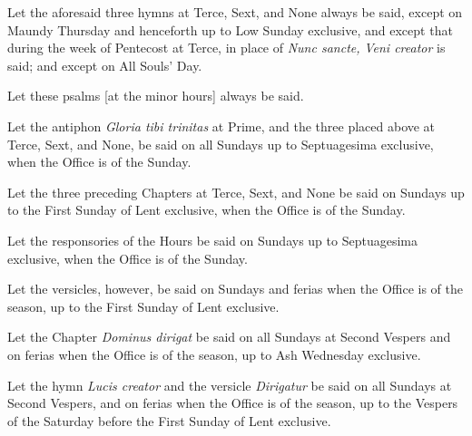 \documentclass[openany]{book}
\renewcommand{\\}{\par\hspace*{.25em}} %
\renewcommand{\newline}{\par}
\begin{document}
\newline Let the aforesaid three hymns at Terce, Sext, and None always be said, except on Maundy Thursday and henceforth up to Low Sunday exclusive, and except that during the week of Pentecost at Terce, in place of \emph{Nunc sancte,} \emph{Veni creator} is said; and except on All Souls' Day.
\newline Let these psalms [at the minor hours] always be said.
\newline Let the antiphon \emph{Gloria tibi trinitas} at Prime, and the three placed above at Terce, Sext, and None, be said on all Sundays up to Septuagesima exclusive, when the Office is of the Sunday.
\newline Let the three preceding Chapters at Terce, Sext, and None be said on Sundays up to the First Sunday of Lent exclusive, when the Office is of the Sunday.
\newline Let the responsories of the Hours be said on Sundays up to Septuagesima exclusive, when the Office is of the Sunday.
\newline Let the versicles, however, be said on Sundays and ferias when the Office is of the season, up to the First Sunday of Lent exclusive.
\newline Let the Chapter \emph{Dominus dirigat} be said on all Sundays at Second Vespers and on ferias when the Office is of the season, up to Ash Wednesday exclusive.
\newline Let the hymn \emph{Lucis creator} and the versicle \emph{Dirigatur} be said on all Sundays at Second Vespers, and on ferias when the Office is of the season, up to the Vespers of the Saturday before the First Sunday of Lent exclusive.
\end{document}
